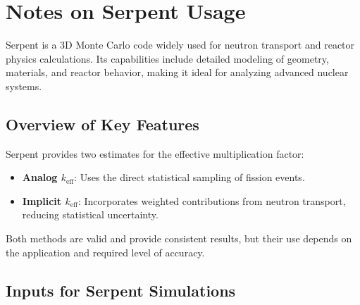{\section{Notes on Serpent Usage}

Serpent is a 3D Monte Carlo code widely used for neutron transport and reactor physics calculations. Its capabilities include detailed modeling of geometry, materials, and reactor behavior, making it ideal for analyzing advanced nuclear systems.

\subsection{Overview of Key Features}

Serpent provides two estimates for the effective multiplication factor:
\begin{itemize}
    \item \textbf{Analog $k_{\text{eff}}$}: Uses the direct statistical sampling of fission events.
    \item \textbf{Implicit $k_{\text{eff}}$}: Incorporates weighted contributions from neutron transport, reducing statistical uncertainty.
\end{itemize}

Both methods are valid and provide consistent results, but their use depends on the application and required level of accuracy.

\subsection{Inputs for Serpent Simulations}

}
